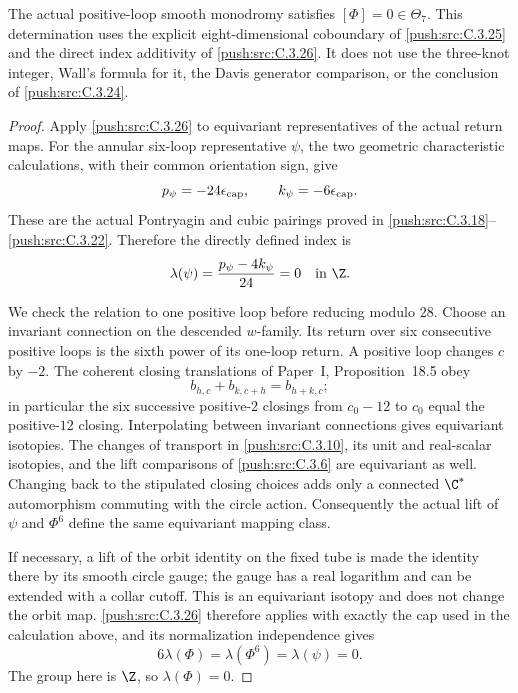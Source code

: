 \begin{corollary}\label{push:src:C.3.27}
The actual positive-loop smooth monodromy satisfies
$[\Phi]=0\in\Theta_7$. This determination uses the explicit
eight-dimensional coboundary of \ref{push:src:C.3.25} and the direct index
additivity of \ref{push:src:C.3.26}. It does not use the three-knot integer,
Wall's formula for it, the Davis generator comparison, or the
conclusion of \ref{push:src:C.3.24}.
\end{corollary}

\begin{proof}
Apply \ref{push:src:C.3.26} to equivariant representatives of the actual return
maps. For the annular six-loop representative $\psi$, the two
geometric characteristic calculations, with their common
orientation sign, give
\[
 p_\psi=-24\epsilon_{\rm cap},\qquad
 k_\psi=-6\epsilon_{\rm cap}.
\]
These are the actual Pontryagin and cubic pairings proved in
\ref{push:src:C.3.18}--\ref{push:src:C.3.22}. Therefore the directly defined index is
\[
 \lambda(\psi)=\frac{p_\psi-4k_\psi}{24}=0
 \quad\hbox{in }\Z.
\]

We check the relation to one positive loop before reducing
modulo $28$. Choose an invariant connection on the descended
$w$-family. Its return over six consecutive positive loops is
the sixth power of its one-loop return. A positive loop changes
$c$ by $-2$. The coherent closing translations of Paper~I, Proposition~18.5 obey
\[
 b_{h,c}+b_{k,c+h}=b_{h+k,c};
\]
in particular the six successive positive-$2$ closings from
$c_0-12$ to $c_0$ equal the positive-$12$ closing. Interpolating
between invariant connections gives equivariant isotopies.
The changes of transport in \ref{push:src:C.3.10}, its unit and real-scalar
isotopies, and the lift comparisons of \ref{push:src:C.3.6} are equivariant
as well. Changing back to the stipulated closing choices
adds only a connected $\C^*$ automorphism commuting with the
circle action. Consequently the actual lift of $\psi$ and
$\Phi^6$ define the same equivariant mapping class.

If necessary, a lift of the orbit identity on the fixed tube
is made the identity there by its smooth circle gauge; the
gauge has a real logarithm and can be extended with a collar
cutoff. This is an equivariant isotopy and does not change the
orbit map. \ref{push:src:C.3.26} therefore applies with exactly the cap used
in the calculation above, and its normalization independence
gives
\[
 6\lambda(\Phi)=\lambda(\Phi^6)=\lambda(\psi)=0.
\]
The group here is $\Z$, so $\lambda(\Phi)=0$.


\end{proof}

